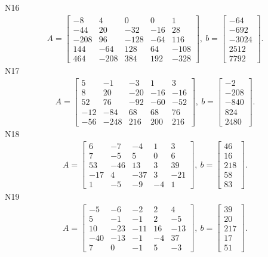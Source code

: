\documentclass[11pt]{report}
\begin{document}
N16
\begin{align*}
 A = \left[\begin{matrix}-8 & 4 & 0 & 0 & 1\\-44 & 20 & -32 & -16 & 28\\-208 & 96 & -128 & -64 & 116\\144 & -64 & 128 & 64 & -108\\464 & -208 & 384 & 192 & -328\end{matrix}\right],
\ b = \left[\begin{matrix}-64\\-692\\-3024\\2512\\7792\end{matrix}\right]. 
 \end{align*}
N17
\begin{align*}
 A = \left[\begin{matrix}5 & -1 & -3 & 1 & 3\\8 & 20 & -20 & -16 & -16\\52 & 76 & -92 & -60 & -52\\-12 & -84 & 68 & 68 & 76\\-56 & -248 & 216 & 200 & 216\end{matrix}\right],
\ b = \left[\begin{matrix}-2\\-208\\-840\\824\\2480\end{matrix}\right]. 
 \end{align*}
N18
\begin{align*}
 A = \left[\begin{matrix}6 & -7 & -4 & 1 & 3\\7 & -5 & 5 & 0 & 6\\53 & -46 & 13 & 3 & 39\\-17 & 4 & -37 & 3 & -21\\1 & -5 & -9 & -4 & 1\end{matrix}\right],
\ b = \left[\begin{matrix}46\\16\\218\\58\\83\end{matrix}\right]. 
 \end{align*}
N19
\begin{align*}
 A = \left[\begin{matrix}-5 & -6 & -2 & 2 & 4\\5 & -1 & -1 & 2 & -5\\10 & -23 & -11 & 16 & -13\\-40 & -13 & -1 & -4 & 37\\7 & 0 & -1 & 5 & -3\end{matrix}\right],
\ b = \left[\begin{matrix}39\\20\\217\\17\\51\end{matrix}\right]. 
 \end{align*}
\end{document}

